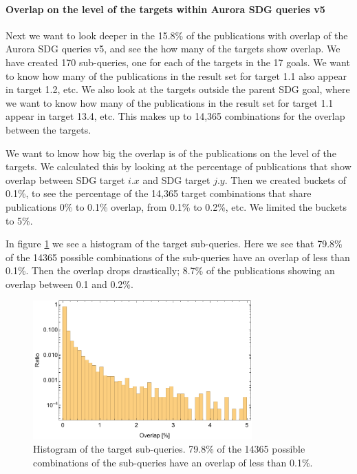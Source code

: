 \documentclass{article}
\begin{document}
\paragraph{Overlap on the level of the targets within Aurora SDG queries v5}
Next we want to look deeper in the 15.8\% of the publications with overlap of the Aurora SDG queries v5, and see the how many of the targets show overlap. We have created 170 sub-queries, one for each of the targets in the 17 goals. We want to know how many of the publications in the result set for target 1.1 also appear in target 1.2, etc. We also look at the targets outside the parent SDG goal, where we want to know how many of the publications in the result set for target 1.1 appear in target 13.4, etc. This makes up to 14,365 combinations for the overlap between the targets.

We want to know how big the overlap is of the publications on the level of the targets. We calculated this by looking at the percentage of publications that show overlap between SDG target $i.x$ and SDG target $j.y$. Then we created buckets of 0.1\%, to see the percentage of the 14,365 target combinations that share publications 0\% to 0.1\% overlap, from 0.1\% to 0.2\%, etc. We limited the buckets to 5\%.

In figure \ref{subquerieshistogram} we see a histogram of the target sub-queries. Here we see that 79.8\% of the 14365 possible combinations of the sub-queries have an overlap of less than 0.1\%. Then the overlap drops drastically; 8.7\% of the publications showing an overlap between 0.1 and 0.2\%.

\begin{figure}[H]
	\centering
  \includegraphics[width=0.75\textwidth]{figures/subqueryhistogram.pdf}
	\caption{Histogram of the target sub-queries. 79.8\% of the 14365 possible combinations of the sub-queries have an overlap of less than 0.1\%.}
	\label{subquerieshistogram}
\end{figure}
\end{document}

